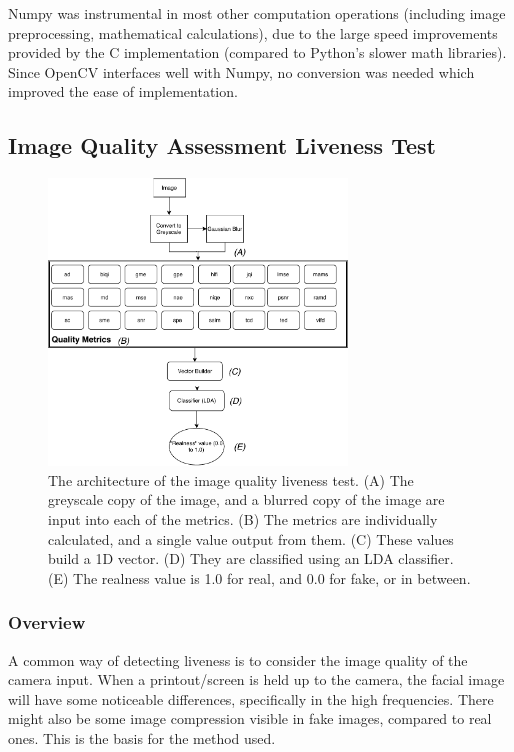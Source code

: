 \documentclass[12pt,a4paper]{article}
\begin{document}
            Numpy was instrumental in most other computation operations (including image preprocessing, mathematical calculations), due to the large speed improvements provided by the C implementation (compared to Python's slower math libraries).
            Since OpenCV interfaces well with Numpy, no conversion was needed which improved the ease of implementation.

        \subsection{Image Quality Assessment Liveness Test}
           \begin{figure}
                \centering
                \includegraphics[width=300px]{ImageQualityLivenessTest.pdf}
                \caption{The architecture of the image quality liveness test. (A) The greyscale copy of the image, and a blurred copy of the image are input into each of the metrics.
                (B) The metrics are individually calculated, and a single value output from them. (C) These values build a 1D vector. (D) They are classified using an LDA classifier. (E) The realness value
                is 1.0 for real, and 0.0 for fake, or in between.}
                \label{ImageQualityLivenessTestDiagram}
            \end{figure}

            \subsubsection{Overview}
            A common way of detecting liveness is to consider the image quality of the camera input. When a printout/screen is held up to the camera, the facial image
            will have some noticeable differences, specifically in the high frequencies. There might also be some image compression visible in fake images, compared to real ones.
            This is the basis for the method used.
\end{document}
